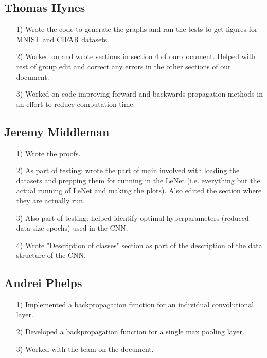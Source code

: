 \documentclass{article}
\begin{document}
\subsection{Thomas Hynes}
\begin{itemize}
    \item[1)] Wrote the code to generate the graphs and ran the tests to get figures for MNIST and CIFAR datasets.
    \item[2)] Worked on and wrote sections in section 4 of our document. Helped with rest of group edit and correct any errors in the other sections of our document.
    \item[3)] Worked on code improving forward and backwards propagation methods in an effort to reduce computation time.
\end{itemize}

\subsection{Jeremy Middleman}
\begin{itemize}
    \item[1)] Wrote the proofs.
    \item[2)] As part of testing: wrote the part of main involved with loading the datasets and prepping them for running in the LeNet (i.e. everything but the actual running of LeNet and making the plots). Also edited the section where they are actually run.
    \item [3)] Also part of testing: helped identify optimal hyperparameters (reduced-data-size epochs) used in the CNN.
    \item [4)] Wrote "Description of classes" section as part of the description of the data structure of the CNN.
\end{itemize}

\subsection{Andrei Phelps}
\begin{itemize}
\item[1)] Implemented a backpropagation function for an individual convolutional layer.
\item[2)] Developed a backpropagation function for a single max pooling layer.
\item[3)] Worked with the team on the document.
\end{itemize}
\end{document}
